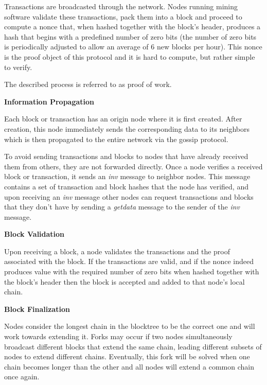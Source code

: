 Transactions are broadcasted through the network. Nodes running mining software validate these transactions, pack them into a block and proceed to compute a nonce that, when hashed together with the block’s header, produces a hash that begins with a predefined number of zero bits (the number of zero bits is periodically adjusted to allow an average of 6 new blocks per hour). This nonce is the proof object of this protocol and it is hard to compute, but rather simple to verify.

The described process is referred to as proof of work.

\vspace{0.25cm}


\textbf{Information Propagation}

Each block or transaction has an origin node where it is first created. After creation, this node immediately sends the corresponding data to its neighbors which is then propagated to the entire network via the gossip protocol.

To avoid sending transactions and blocks to nodes that have already received them from others, they are not forwarded directly. Once a node verifies a received block or transaction, it sends an \textit{inv} message to neighbor nodes. This message contains a set of transaction and block hashes that the node has verified, and upon receiving an \textit{inv} message other nodes can request transactions and blocks that they don’t have by sending a \textit{getdata} message to the sender of the \textit{inv} message.

\vspace{0.25cm}

\textbf{Block Validation}

Upon receiving a block, a node validates the transactions and the proof associated with the block. If the transactions are valid, and if the nonce indeed produces value with the required number of zero bits when hashed together with the block’s header then the block is accepted and added to that node’s local chain.

\vspace{0.25cm}

\textbf{Block Finalization}

Nodes consider the longest chain in the blocktree to be the correct one and will work towards extending it. Forks may occur if two nodes simultaneously broadcast different blocks that extend the same chain, leading different subsets of nodes to extend different chains. Eventually, this fork will be solved when one chain becomes longer than the other and all nodes will extend a common chain once again.

